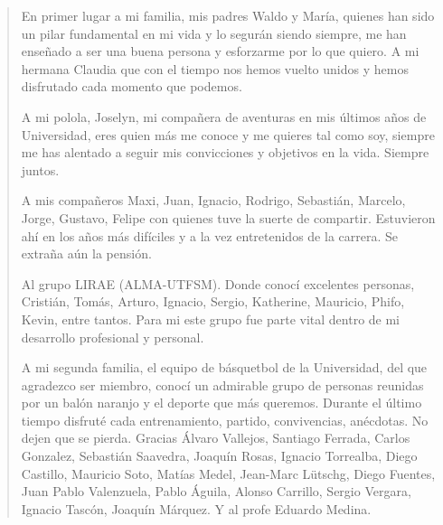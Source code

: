 \vspace*{2cm}
\thispagestyle{empty}
\begin{quotation}
\begin{itshape}
En primer lugar a mi familia, mis padres Waldo y María, quienes han sido un
pilar fundamental en mi vida y lo segurán siendo siempre, me han enseñado a
ser una buena persona y esforzarme por lo que quiero. A mi hermana Claudia que
con el tiempo nos hemos vuelto unidos y hemos disfrutado cada momento que
podemos.

\vspace{1cm}
A mi polola, Joselyn, mi compañera de aventuras en mis últimos años de
Universidad, eres quien más me conoce y me quieres tal como soy, siempre me has
alentado a seguir mis convicciones y objetivos en la vida. Siempre juntos.

\vspace{1cm}
A mis compañeros Maxi, Juan, Ignacio, Rodrigo, Sebastián, Marcelo, Jorge,
Gustavo, Felipe con quienes tuve la suerte de compartir.  Estuvieron ahí en los
años más difíciles y a la vez entretenidos de la carrera.  Se extraña aún la
pensión.

\vspace{1cm}
Al grupo LIRAE (ALMA-UTFSM). Donde conocí excelentes personas, Cristián, Tomás,
Arturo, Ignacio, Sergio, Katherine, Mauricio, Phifo, Kevin, entre tantos.  Para
mi este grupo fue parte vital dentro de mi desarrollo profesional y personal. 

\vspace{1cm}
A mi segunda familia, el equipo de básquetbol de la Universidad, del que
agradezco ser miembro, conocí un admirable grupo de personas reunidas por un
balón naranjo y el deporte que más queremos. Durante el último tiempo disfruté
cada entrenamiento, partido, convivencias, anécdotas. No dejen que se pierda.
Gracias Álvaro Vallejos, Santiago Ferrada, Carlos Gonzalez,  Sebastián
Saavedra, Joaquín Rosas, Ignacio Torrealba,  Diego Castillo, Mauricio Soto,
Matías Medel, Jean-Marc Lütschg, Diego Fuentes, Juan Pablo Valenzuela, Pablo
Águila, Alonso Carrillo, Sergio Vergara, Ignacio Tascón, Joaquín Márquez. Y al
profe Eduardo Medina.

\end{itshape}
\end{quotation}
